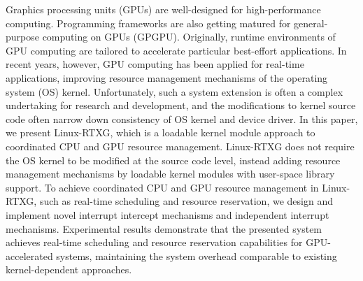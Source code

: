 Graphics processing units (GPUs) are well-designed for high-performance
computing.
Programming frameworks are also getting matured for general-purpose
computing on GPUs (GPGPU).
Originally, runtime environments of GPU computing are tailored to
accelerate particular best-effort applications.
In recent years, however, GPU computing has been applied for real-time
applications, improving resource management mechanisms of the operating
system (OS) kernel.
Unfortunately, such a system extension is often a complex undertaking
for research and development, and the modifications to kernel source
code often narrow down consistency of OS kernel and device driver.
In this paper, we present Linux-RTXG, which is a loadable kernel module
approach to coordinated CPU and GPU resource management.
Linux-RTXG does not require the OS kernel to be modified at the source
code level, instead adding resource management mechanisms by loadable
kernel modules with user-space library support.
To achieve coordinated CPU and GPU resource management in Linux-RTXG,
such as real-time scheduling and resource reservation, we design and
implement novel interrupt intercept mechanisms and independent interrupt
mechanisms.
Experimental results demonstrate that the presented system achieves
real-time scheduling and resource reservation capabilities for
GPU-accelerated systems, maintaining the system overhead comparable to
existing kernel-dependent approaches.
